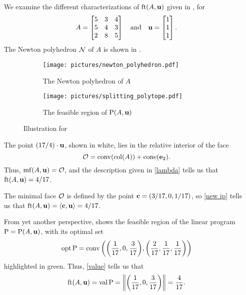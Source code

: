 \documentclass{amsart}
\begin{document}
\begin{example}
   \label{ex: ft}
   We examine the different characterizations of $\operatorname{ft}(A, \mathbf{u})$ given in , for
   \[A=\begin{bmatrix}5&3&4\\ 5&4&3\\ 2&8&5\end{bmatrix} \quad \text{and} \quad \mathbf{u} =
      \begin{bmatrix} 1 \\ 1\\ 1 \end{bmatrix}.\]
   The Newton polyhedron $\mathcal{N}$ of $A$ is shown in .
   \begin{figure}
   \centering
   \begin{subfigure}{.48\textwidth}
      \centering
      \texttt{[image: pictures/newton\_polyhedron.pdf]}\\[1.4mm]
      \caption{The Newton polyhedron of $A$}
      \label{fig: newton polyhedron}
   \end{subfigure}
   \begin{subfigure}{.48\textwidth}
      \centering
      \texttt{[image: pictures/splitting\_polytope.pdf]}
      \caption{The feasible region of $\mathrm{P}(A,\mathbf{u})$}
      \label{fig: splitting polytope}
   \end{subfigure}
      \caption{Illustration for }
   \label{fig: newton polyhedron and splitting polytope}
   \end{figure}
   The point $(17/4)\cdot \mathbf{u}$, shown in white, lies in the relative interior of the face
   \[\mathcal{O} = \operatorname{conv}(\operatorname{col}(A)) + \operatorname{cone}(\mathbf{e}_2).\]
   Thus, $\operatorname{mf}(A,\mathbf{u}) = \mathcal{O}$, and the description given in \ref{lambda} tells us that $\operatorname{ft}(A, \mathbf{u}) = 4/17$.

   The minimal face $\mathcal{O}$ is defined by the point $\mathbf{c} = (3/17, 0, 1/17)$, so \ref{new ip} tells us that
   $\operatorname{ft}(A, \mathbf{u}) = \langle \mathbf{c}, \mathbf{u} \rangle = 4/17$.

   From yet another perspective,  shows the feasible region of the linear program $\mathrm{P} = \mathrm{P}(A,\mathbf{u})$, with its optimal set
   \[\operatorname{opt} \mathrm{P} = \operatorname{conv}\bigg(\bigg(\frac1{17}, 0, \frac3{17}\bigg),\bigg(\frac2{17}, \frac1{17}, \frac1{17}\bigg)\bigg)\]
   highlighted in green.
   Thus, \ref{value} tells us that
   \[\operatorname{ft}(A, \mathbf{u}) = \operatorname{val} \mathrm{P} = \bigg\|\bigg(\frac1{17}, 0, \frac3{17}\bigg)\bigg\| = \frac4{17}.\]
\end{example}
\end{document}
